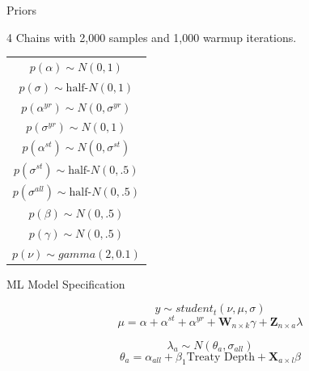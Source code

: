 \documentclass[12pt]{beamer}
\begin{document}


\begin{frame}{Priors}

4 Chains with 2,000 samples and 1,000 warmup iterations. 

\begin{table} %

 \begin{center}
\begin{tabular}{c} 
$ p(\alpha) \sim N(0, 1)$  \\
$ p(\sigma) \sim \mbox{half-}N(0, 1) $ \\
$ p(\alpha^{yr}) \sim N(0, \sigma^{yr}) $ \\ 
$ p(\sigma^{yr}) \sim N(0, 1) $ \\
$ p(\alpha^{st}) \sim N(0, \sigma^{st}) $ \\ 
$ p(\sigma^{st}) \sim \mbox{half-}N(0, .5) $ \\ 
$ p(\sigma^{all}) \sim \mbox{half-}N(0, .5) $ \\
$ p(\beta) \sim N(0, .5) $ \\
$ p(\gamma) \sim N(0, .5) $ \\ 
$ p(\nu) \sim gamma(2, 0.1)$ 
\end{tabular} 
\end{center} 
\label{tab:priors}
\end{table} 


\end{frame}




\begin{frame}{ML Model Specification}

\begin{equation}
y \sim student_t(\nu, \mu, \sigma)
\end{equation}
\begin{equation}
\mu = \alpha + \alpha^{st} + \alpha^{yr} +\textbf{W}_{n \times k} \gamma + \textbf{Z}_{n \times a} \lambda
\end{equation}

\begin{equation}
\lambda_{a} \sim N(\theta_{a}, \sigma_{all})
\end{equation}
\begin{equation}
\theta_a = \alpha_{all} + \beta_1 \mbox{Treaty Depth} + \textbf{X}_{a \times l} \beta
\end{equation}


\end{frame}
\end{document}
